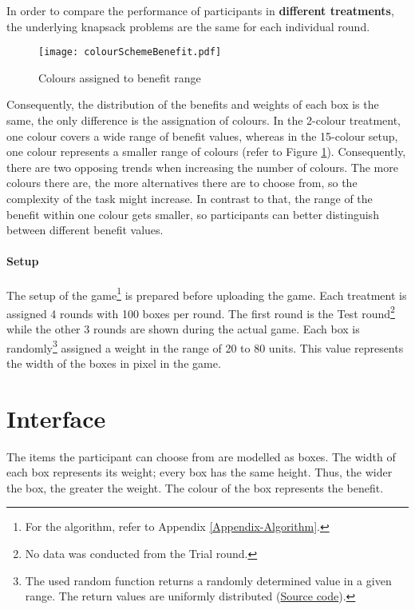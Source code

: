 In order to compare the performance of participants in \textbf{different treatments}, the underlying knapsack problems are the same for each individual round.
 \begin{figure}[htp] %
\begin{center}
  \texttt{[image: colourSchemeBenefit.pdf]}
\caption{Colours assigned to benefit range}
\label{fig:colourSchemeBenefit}
\end{center}
\end{figure}
Consequently, the distribution of the benefits and weights of each box is the same, the only difference is the assignation of colours. In the 2-colour treatment, one colour covers a wide range of benefit values, whereas in the 15-colour setup, one colour represents a smaller range of colours (refer to Figure \ref{fig:colourSchemeBenefit}).  Consequently, there are two opposing trends when increasing the number of colours. The more colours there are, the more alternatives there are to choose from, so the complexity of the task might increase. In contrast to that, the range of the benefit within one colour gets smaller, so participants can better distinguish between different benefit values.

\paragraph{Setup}
\label{ch:Experiment:sec:Setup}

The setup of the game\footnote{For the algorithm, refer to Appendix \ref{Appendix-Algorithm}.} is prepared before uploading the game. 
Each treatment is assigned 4 rounds with 100 boxes per round. The first round is the Test round\footnote{No data was conducted from the Trial round.} while the other 3 rounds are shown during the actual game.
Each box is randomly\footnote{The used random function returns a randomly determined value in a given range. The return values are uniformly distributed (\href{http://hg.python.org/cpython/file/2.7/Lib/random.py}{Source code}).} assigned a weight in the range of 20 to 80 units. This value represents the width of the boxes in pixel in the game.



\section{Interface}
\label{ch:Experiment:sec:Interface}
The items the participant can choose from are modelled as boxes. The width of each box represents its weight; every box has the same height. Thus, the wider the box, the greater the weight. 
The colour of the box represents the benefit.

